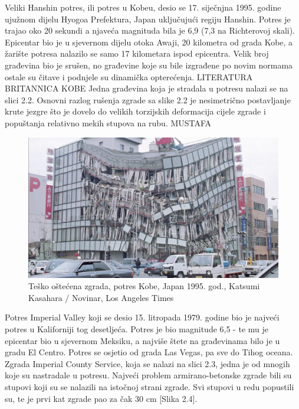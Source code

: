 \documentclass[12pt]{book}
\begin{document}
\newpage

Veliki Hanshin potres, ili potres u Kobeu, desio se 17. siječnjna 1995. godine ujužnom dijelu Hyogoa Prefektura, Japan uključujući regiju Hanshin. Potres je trajao oko 20 sekundi a njaveća magnituda bila je 6,9 (7,3 na Richterovoj skali). Epicentar bio je u sjevernom dijelu otoka Awaji, 20 kilometra od grada Kobe, a žarište potresa nalazilo se samo 17 kilometara ispod epicentra. Velik broj građevina bio je srušen, no građevine koje su bile izgrađene po novim normama ostale su čitave i podnjele su dinamička opterećenja. LITERATURA BRITANNICA KOBE Jedna građevina koja je stradala u potresu nalazi se na slici 2.2. Osnovni razlog rušenja zgrade sa slike 2.2 je nesimetrično postavljanje krute jezgre što je dovelo do velikih torzijskih deformacija cijele zgrade i popuštanja relativno mekih stupova na rubu. MUSTAFA

\begin{figure}[h]
	\centering
	\includegraphics[width=1\linewidth]{Slike/screenshot004}
	\caption{Teško oštećena zgrada, potres Kobe, Japan 1995. god., Katsumi Kasahara / Novinar, Los Angeles Times }
	\label{fig:screenshot004}
\end{figure}

\newpage

Potres Imperial Valley koji se desio 15. litropada 1979. godine bio je najveći potres u Kaliforniji tog desetljeća. Potres je bio magnitude 6,5 - te mu je epicentar bio u sjevernom Meksiku, a najviše štete na građevinama bilo je u gradu El Centro. Potres se osjetio od grada Las Vegas, pa sve do Tihog oceana. Zgrada Imperial County Service, koja se nalazi na slici 2.3,  jedna je od mnogih koje su nastradale u potresu. Najveći problem armirano-betonske zgrade bili su stupovi koji su se nalazili na istočnoj strani zgrade. Svi stupovi u redu popustili su, te je prvi kat zgrade pao za čak 30 cm [Slika 2.4]. 
\end{document}
